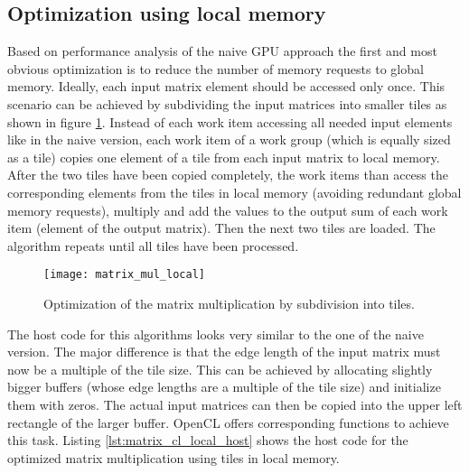 \subsection{Optimization using local memory}
Based on performance analysis of the naive GPU approach the first and most obvious optimization is to reduce the number of memory requests to global memory. Ideally, each input matrix element should be accessed only once. This scenario can be achieved by subdividing the input matrices into smaller tiles as shown in figure \ref{fig:matrix_mul_local}. Instead of each work item accessing all needed input elements like in the naive version, each work item of a work group (which is equally sized as a tile) copies one element of a tile from each input matrix to local memory. After the two tiles have been copied completely, the work items than access the corresponding elements from the tiles in local memory (avoiding redundant global memory requests), multiply and add the values to the output sum of each work item (element of the output matrix). Then the next two tiles are loaded. The algorithm repeats until all tiles have been processed.

\begin{figure}
\centering
\texttt{[image: matrix\_mul\_local]}
\caption{Optimization of the matrix multiplication by subdivision into tiles.}
\label{fig:matrix_mul_local}
\end{figure}

The host code for this algorithms looks very similar to the one of the naive version. The major difference is that the edge length of the input matrix must now be a multiple of the tile size. This can be achieved by allocating slightly bigger buffers (whose edge lengths are a multiple of the tile size) and initialize them with zeros. The actual input matrices can then be copied into the upper left rectangle of the larger buffer. OpenCL offers corresponding functions to achieve this task. Listing \ref{lst:matrix_cl_local_host} shows the host code for the optimized matrix multiplication using tiles in local memory.



